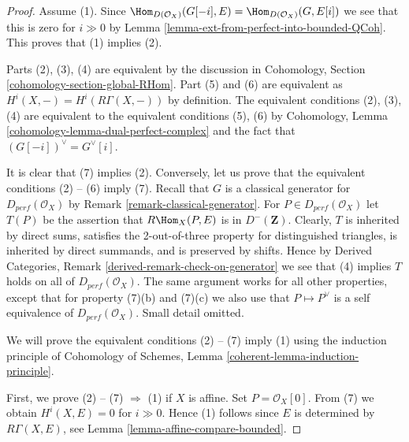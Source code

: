 \begin{proof}
Assume (1). Since
$\Hom_{D(\mathcal{O}_X)}(G[-i], E) = \Hom_{D(\mathcal{O}_X)}(G, E[i])$
we see that this is zero for $i \gg 0$ by
Lemma \ref{lemma-ext-from-perfect-into-bounded-QCoh}. This proves
that (1) implies (2).

\medskip\noindent
Parts (2), (3), (4) are equivalent by the discussion in
Cohomology, Section \ref{cohomology-section-global-RHom}.
Part (5) and (6) are equivalent as $H^i(X, -) = H^i(R\Gamma(X, -))$
by definition. The equivalent conditions (2), (3), (4) are
equivalent to the equivalent conditions (5), (6) by
Cohomology, Lemma \ref{cohomology-lemma-dual-perfect-complex}
and the fact that $(G[-i])^\vee = G^\vee[i]$.

\medskip\noindent
It is clear that (7) implies (2). Conversely, 
let us prove that the equivalent conditions (2) -- (6) imply (7).
Recall that $G$ is a  classical generator for $D_{perf}(\mathcal{O}_X)$ by
Remark \ref{remark-classical-generator}.
For $P \in D_{perf}(\mathcal{O}_X)$ let $T(P)$ be the assertion that
$R\Hom_X(P, E)$ is in $D^-(\mathbf{Z})$.
Clearly, $T$ is inherited by direct sums,
satisfies the 2-out-of-three property for distinguished
triangles, is inherited by direct summands, and is preserved by shifts.
Hence by Derived Categories, Remark \ref{derived-remark-check-on-generator}
we see that (4) implies $T$ holds on all of $D_{perf}(\mathcal{O}_X)$.
The same argument works for all other properties, except that for property
(7)(b) and (7)(c) we also use that $P \mapsto P^\vee$ is a self
equivalence of $D_{perf}(\mathcal{O}_X)$. Small detail omitted.

\medskip\noindent
We will prove the equivalent conditions (2) -- (7) imply (1)
using the induction principle of
Cohomology of Schemes, Lemma \ref{coherent-lemma-induction-principle}.

\medskip\noindent
First, we prove (2) -- (7) $\Rightarrow$ (1) if $X$ is affine.
Set $P = \mathcal{O}_X[0]$. From (7) we obtain $H^i (X, E) = 0$ for $i \gg 0$.
Hence (1) follows since $E$ is determined by $R\Gamma (X, E)$,
see Lemma \ref{lemma-affine-compare-bounded}.


\end{proof}
